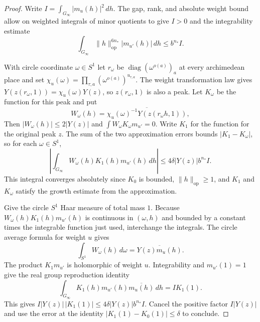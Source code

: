 \begin{proof}
Write $I=\int_{G_\infty}|m_u(h)|^2\,dh$. The gap, rank, and absolute weight bound allow  on weighted integrals of minor quotients to give $I>0$ and the integrability estimate
\[
 \int_{G_\infty}\|h\|_{\mathrm{op}}^{6n_*}|m_{u'}(h)|\,dh
 \le b^{n_*} I .
\]

With circle coordinate $\omega\in S^1$ let $r_\omega$ be $\operatorname{diag}(\omega^{o(a)})_a$ at every archimedean place and set $\chi_u(\omega)=\prod_{\tau,a}(\omega^{o(a)})^{u_{\tau,a}}$. The weight transformation law gives $Y(z(r_\omega,1))=\chi_u(\omega)Y(z)$, so $z(r_\omega,1)$ is also a peak. Let $K_\omega$ be the function for this peak and put
\[
 W_\omega(h)=\overline{\chi_u(\omega)^{-1}Y(z(r_\omega h,1))},
\]
Then $|W_\omega(h)|\le2|Y(z)|$ and $\int W_\omega K_\omega m_{u'}=0$. Write $K_1$ for the function for the original peak $z$. The sum of the two approximation errors bounds $|K_1-K_\omega|$, so for each $\omega\in S^1$,
\[
 \left|\int_{G_\infty}W_\omega(h)K_1(h)m_{u'}(h)\,dh\right|
 \le 4\delta |Y(z)|b^{n_*}I .
\]
This integral converges absolutely since $K_0$ is bounded, $\|h\|_{\mathrm{op}}\ge1$, and $K_1$ and $K_\omega$ satisfy the growth estimate from the approximation.

Give the circle $S^1$ Haar measure of total mass $1$. Because $W_\omega(h)K_1(h)m_{u'}(h)$ is continuous in $(\omega,h)$ and bounded by a constant times the integrable function just used, interchange the integrals. The circle average formula for weight $u$ gives
\[
 \int_{S^1}W_\omega(h)\,d\omega=\overline{Y(z)m_u(h)} .
\]
The product $K_1m_{u'}$ is holomorphic of weight $u$. Integrability and $m_{u'}(1)=1$ give the real group reproduction identity
\[
 \int_{G_\infty}K_1(h)m_{u'}(h)\overline{m_u(h)}\,dh=I K_1(1).
\]
This gives $I|Y(z)|\,|K_1(1)|\le4\delta|Y(z)|b^{n_*}I$. Cancel the positive factor $I|Y(z)|$ and use the error at the identity $|K_1(1)-K_0(1)|\le\delta$ to conclude.
\end{proof}

